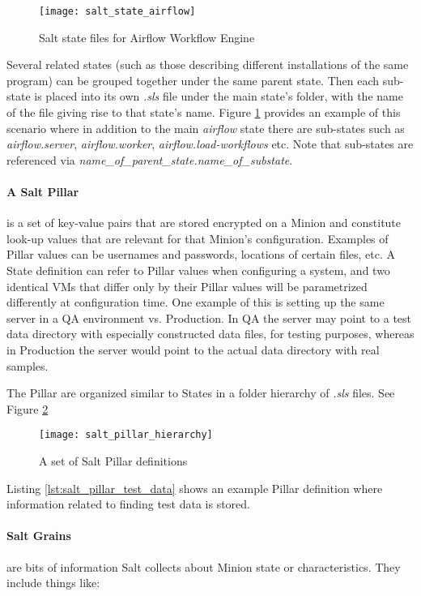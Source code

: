 \begin{figure}[H]
\texttt{[image: salt\_state\_airflow]}
\centering
\caption {Salt state files for Airflow Workflow Engine}
\label{fig:salt_state_airflow}
\end{figure}

Several related states (such as those describing different installations of the same program) can be grouped together under the same parent state. Then each sub-state is placed into its own \emph{.sls} file under the main state's folder, with the name of the file giving rise to that state's name. Figure \ref{fig:salt_state_airflow} provides an example of this scenario where in addition to the main \emph{airflow} state there are sub-states such as \emph{airflow.server}, \emph{airflow.worker}, \emph{airflow.load-workflows} etc. Note that sub-states are referenced via \emph{name\_of\_parent\_state.name\_of\_substate}.

\paragraph{A Salt Pillar} is a set of key-value pairs that are stored encrypted on a Minion and constitute look-up values that are relevant for that Minion's configuration. Examples of Pillar values can be usernames and passwords, locations of certain files, etc. A State definition can refer to Pillar values when configuring a system, and two identical VMs that differ only by their Pillar values will be parametrized differently at configuration time. One example of this is setting up the same server in a QA environment vs. Production. In QA the server may point to a test data directory with especially constructed data files, for testing purposes, whereas in Production the server would point to the actual data directory with real samples.

The Pillar are organized similar to States in a folder hierarchy of \emph{.sls} files. See Figure \ref{fig:salt_pillar_hierarchy}

\begin{figure}[H]
\texttt{[image: salt\_pillar\_hierarchy]}
\centering
\caption {A set of Salt Pillar definitions}
\label{fig:salt_pillar_hierarchy}
\end{figure}

Listing \ref{lst:salt_pillar_test_data} shows an example Pillar definition where information related to finding test data is stored.

\paragraph{Salt Grains} are bits of information Salt collects about Minion state or characteristics. They include things like:

